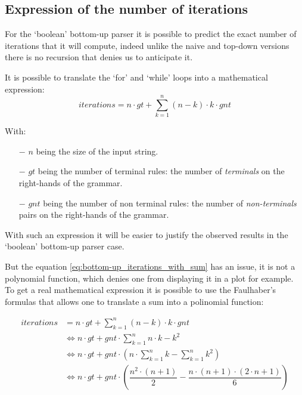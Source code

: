 \subsection{Expression of the number of iterations}

For the `boolean' bottom-up parser it is possible to predict the exact number of iterations that it will compute, indeed unlike the naive and top-down versions there is no recursion that denies us to anticipate it.

It is possible to translate the `for' and `while' loops into a mathematical expression:
\begin{equation} \label{eq:bottom-up_iterations_with_sum}
    iterations = n \cdot gt + \sum_{k = 1}^n (n - k) \cdot k \cdot gnt
\end{equation}

With:
\begin{itemize}
    \item[$-$] $n$ being the size of the input string.
    \item[$-$] $gt$ being the number of terminal rules: the number of \textit{terminals} on the right-hands of the grammar.
    \item[$-$] $gnt$ being the number of non terminal rules: the number of \textit{non-terminals} pairs on the right-hands of the grammar.
\end{itemize}

With such an expression it will be easier to justify the observed results in the `boolean' bottom-up parser case.

But the equation \ref{eq:bottom-up_iterations_with_sum} has an issue, it is not a polynomial function, which denies one from displaying it in a plot for example.
To get a real mathematical expression it is possible to use the Faulhaber's formulas that allows one to translate a sum into a polinomial function:

\begin{align*}
    iterations &= n \cdot gt + \sum_{k = 1}^n (n - k) \cdot k \cdot gnt\\
    &\Leftrightarrow n \cdot gt + gnt \cdot \sum_{k = 1}^n n \cdot k - k^2\\
    &\Leftrightarrow n \cdot gt + gnt \cdot (n \cdot \sum_{k = 1}^n k - \sum_{k = 1}^n k^2)\\
    &\Leftrightarrow n \cdot gt + gnt \cdot (\dfrac{n^2 \cdot (n + 1)}{2} - \dfrac{n \cdot (n + 1) \cdot (2 \cdot n + 1)}{6})
\end{align*}

